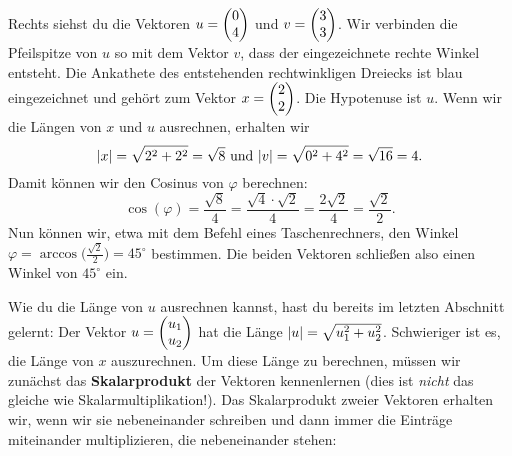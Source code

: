 \documentclass[../../main.tex]{subfiles}
\begin{document}
\begin{example}{}
    Rechts siehst du die Vektoren $u=\begin{pmatrix} 0\\ 4 \end{pmatrix}$ und \mbox{$v=\begin{pmatrix} 3\\ 3 \end{pmatrix}$}. Wir verbinden die Pfeilspitze von $u$
    so mit dem Vektor $v$, dass der eingezeichnete rechte Winkel entsteht. Die Ankathete des entstehenden rechtwinkligen
    Dreiecks ist blau eingezeichnet und gehört zum Vektor $x=\begin{pmatrix} 2\\ 2 \end{pmatrix}$. Die Hypotenuse ist $u$. Wenn wir die Längen
    von $x$ und $u$ ausrechnen, erhalten wir
    \[\lvert x\rvert=\sqrt{2^2+2^2}=\sqrt{8}\text{ und }\lvert v\rvert=\sqrt{0^2+4^2}=\sqrt{16}=4.\]
    Damit können wir den Cosinus von $\varphi$ berechnen:
    \[\cos(\varphi)=\frac{\sqrt{8}}{4}=\frac{\sqrt{4}\cdot\sqrt{2}}{4}=\frac{2\sqrt{2}}{4}=\frac{\sqrt{2}}{2}.\]
    Nun können wir, etwa mit dem Befehl  eines Taschenrechners, den Winkel 
    $\varphi=\arccos\bigl(\frac{\sqrt{2}}{2}\bigr)=45^\circ$ bestimmen. Die beiden Vektoren schließen also einen Winkel
    von $45^\circ$ ein.
\end{example}
Wie du die Länge von $u$ ausrechnen kannst, hast du bereits im letzten Abschnitt gelernt: Der Vektor $u=\begin{pmatrix} u_1\\ u_2 \end{pmatrix}$
hat die Länge $\lvert u\rvert=\sqrt{u_1^2+u_2^2}$. Schwieriger ist es, die Länge von $x$ auszurechnen. Um diese Länge zu berechnen,
müssen wir zunächst das \textbf{Skalarprodukt} der Vektoren kennenlernen (dies ist \emph{nicht} das gleiche wie Skalarmultiplikation!).
Das Skalarprodukt zweier Vektoren erhalten wir, wenn wir sie nebeneinander schreiben und dann immer die Einträge miteinander
multiplizieren, die nebeneinander stehen:
\begin{center}
\end{center}
\end{document}
